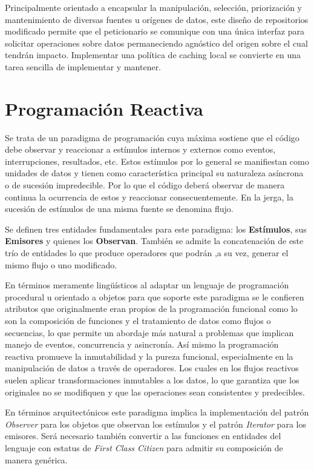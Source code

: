 Principalmente orientado a encapsular la manipulación, selección, priorización y mantenimiento de diversas fuentes u orígenes de datos, este diseño de repositorios modificado permite que el peticionario se comunique con una única interfaz para solicitar operaciones sobre datos permaneciendo agnóstico del origen  sobre el cual tendrán impacto. 
Implementar una política de caching local se convierte en una tarea sencilla de implementar y mantener.

\section{Programación Reactiva}
Se trata de un paradigma de programación cuya máxima sostiene que el código debe observar y reaccionar a estímulos internos y externos como eventos, interrupciones, resultados, etc. Estos estímulos por lo general se manifiestan como unidades de datos y tienen como característica principal su naturaleza asíncrona o de sucesión impredecible. Por lo que el código deberá observar de manera continua la ocurrencia de estos y reaccionar consecuentemente. En la jerga, la sucesión de estímulos de una misma fuente se denomina flujo.

Se definen tres entidades fundamentales para este paradigma: los \textbf{Estímulos}, sus \textbf{Emisores} y quienes los \textbf{Observan}. También se admite la concatenación de este trío de entidades lo que produce operadores que podrán ,a su vez, generar el mismo flujo o uno modificado.

En términos meramente lingüísticos al adaptar un lenguaje de programación procedural u orientado a objetos para que soporte este paradigma se le confieren atributos que originalmente eran propios de la programación funcional como lo son la composición de funciones y el tratamiento de datos como flujos o secuencias, lo que permite un abordaje más natural a problemas que implican manejo de eventos, concurrencia y asincronía.
Así mismo la programación reactiva promueve la inmutabilidad y la pureza funcional, especialmente en la manipulación de datos a través de operadores. Los cuales en los flujos reactivos suelen aplicar transformaciones inmutables a los datos, lo que garantiza que los originales no se modifiquen y que las operaciones sean consistentes y predecibles.

En términos arquitectónicos este paradigma implica la implementación del patrón \emph{Observer} para los objetos que observan los estímulos y el patrón \emph{Iterator} para los emisores. Será necesario también convertir a las funciones en entidades del lenguaje con estatus de  \emph{First Class Citizen} para admitir su composición de manera genérica.

